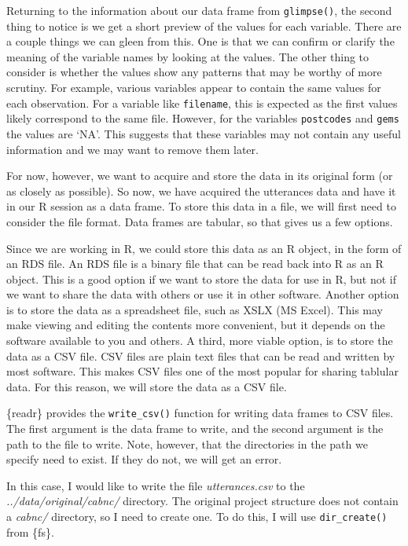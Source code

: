 \documentclass[
  letterpaper,
  krantz1]{latex/krantz-mod}
\theoremstyle{definition}
\theoremstyle{definition}
\theoremstyle{remark}
\begin{document}
Returning to the information about our data frame from
\texttt{glimpse()}, the second thing to notice is we get a short preview
of the values for each variable. There are a couple things we can gleen
from this. One is that we can confirm or clarify the meaning of the
variable names by looking at the values. The other thing to consider is
whether the values show any patterns that may be worthy of more
scrutiny. For example, various variables appear to contain the same
values for each observation. For a variable like \texttt{filename}, this
is expected as the first values likely correspond to the same file.
However, for the variables \texttt{postcodes} and \texttt{gems} the
values are `NA'. This suggests that these variables may not contain any
useful information and we may want to remove them later.

For now, however, we want to acquire and store the data in its original
form (or as closely as possible). So now, we have acquired the
utterances data and have it in our R session as a data frame. To store
this data in a file, we will first need to consider the file format.
Data frames are tabular, so that gives us a few options.

Since we are working in R, we could store this data as an R object, in
the form of an RDS file. An RDS file is a binary file that can be read
back into R as an R object. This is a good option if we want to store
the data for use in R, but not if we want to share the data with others
or use it in other software. Another option is to store the data as a
spreadsheet file, such as XSLX (MS Excel). This may make viewing and
editing the contents more convenient, but it depends on the software
available to you and others. A third, more viable option, is to store
the data as a CSV file. CSV files are plain text files that can be read
and written by most software. This makes CSV files one of the most
popular for sharing tablular data. For this reason, we will store the
data as a CSV file.

\{readr\} provides the \texttt{write\_csv()} function for writing data
frames to CSV files. The first argument is the data frame to write, and
the second argument is the path to the file to write. Note, however,
that the directories in the path we specify need to exist. If they do
not, we will get an error.

In this case, I would like to write the file \emph{utterances.csv} to
the \emph{../data/original/cabnc/} directory. The original project
structure does not contain a \emph{cabnc/} directory, so I need to
create one. To do this, I will use \texttt{dir\_create()} from \{fs\}.
\end{document}
